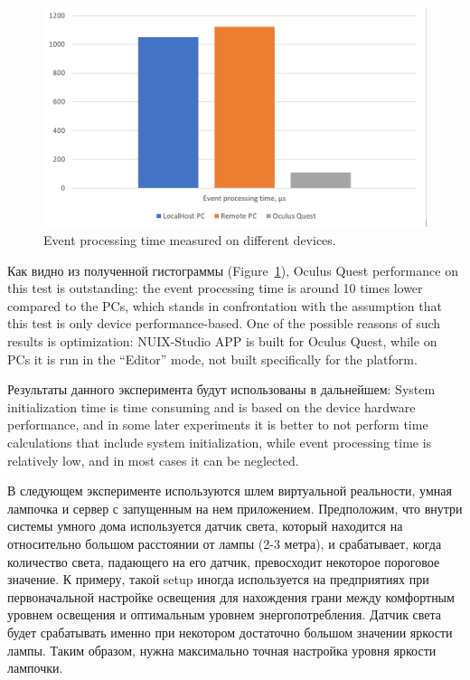 \begin{figure}
  \centering
  \includegraphics[width=0.9\linewidth]{figures/EventProcessingTime.png}
  \caption{Event processing time measured on different devices.}
  \label{fig:EventProcessingTime-figure}
\end{figure}

Как видно из полученной гистограммы (Figure~\ref{fig:EventProcessingTime-figure}), Oculus Quest performance on this test is outstanding: the event processing time is around 10 times lower compared to the PCs, which stands in confrontation with the assumption that this test is only device performance-based. One of the possible reasons of such results is optimization: NUIX-Studio APP is built for Oculus Quest, while on PCs it is run in the “Editor” mode, not built specifically for the platform.


Результаты данного эксперимента будут использованы в дальнейшем: System initialization time is time consuming and is based on the device hardware performance, and in some later experiments it is better to not perform time calculations that include system initialization, while event processing time is relatively low, and in most cases it can be neglected.

В следующем эксперименте используются шлем виртуальной реальности, умная лампочка и сервер с запущенным на нем приложением. Предположим, что внутри системы умного дома используется датчик света, который находится на относительно большом расстоянии от лампы (2-3 метра), и срабатывает, когда количество света, падающего на его датчик, превосходит некоторое пороговое значение. К примеру, такой setup иногда используется на предприятиях при первоначальной настройке освещения для нахождения грани между комфортным уровнем освещения и оптимальным уровнем энергопотребления. Датчик света будет срабатывать именно при некотором достаточно большом значении яркости лампы. Таким образом, нужна максимально точная настройка уровня яркости лампочки.

